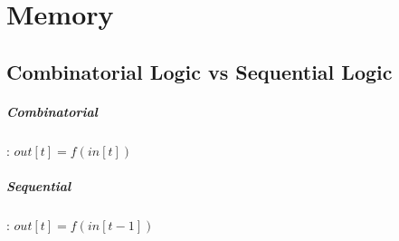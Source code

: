 \chapter{Memory}

\section{Combinatorial Logic vs Sequential Logic}

\paragraph{Combinatorial}: $out[t] = f(in[t])$\\

\paragraph{Sequential}: $out[t] = f(in[t - 1])$\\
